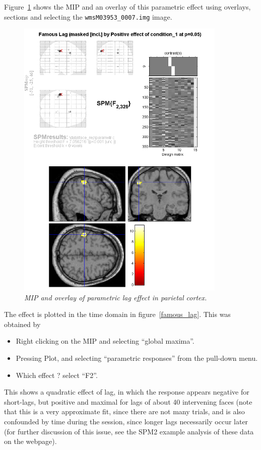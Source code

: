Figure~\ref{famous_lag_mip} shows the MIP and an overlay of this parametric effect using overlays, sections and selecting the \texttt{wmsM03953\_0007.img} image. 
\begin{figure}
\begin{center}
\includegraphics[width=100mm]{faces/famous_lag_mip}
\caption{\em MIP and overlay of parametric lag effect in parietal cortex. \label{famous_lag_mip} }
\end{center}
\end{figure}
The effect is plotted in the time domain in figure~\ref{famous_lag}. This was obtained by
\begin{itemize}
\item Right clicking on the MIP and selecting ``global maxima''.
\item Pressing Plot, and selecting ``parametric responses'' from the pull-down menu.
\item Which effect ? select ``F2''.
\end{itemize}

This shows a quadratic effect of lag, in which the response appears negative for short-lags, but positive and maximal for lags of about 40 intervening faces (note that this is a very approximate fit, since there are not many trials, and is also confounded by time during the session, since longer lags necessarily occur later (for further discussion of this issue, see the SPM2 example analysis of these data on the webpage).

